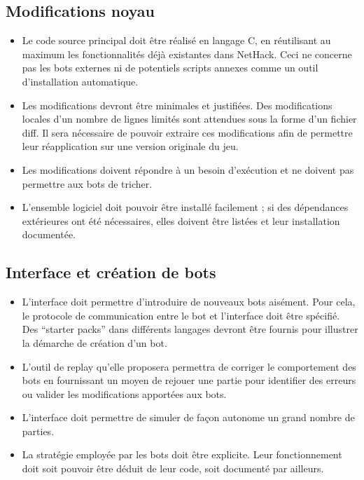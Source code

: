 \documentclass[12pt]{article}
\begin{document}
\subsection{Modifications noyau}

\begin{itemize}
	\item Le code source principal doit être réalisé en langage C, en réutilisant au maximum les fonctionnalités déjà existantes dans NetHack. Ceci ne concerne pas les bots externes ni de potentiels scripts annexes comme un outil d'installation automatique.
	\item Les modifications devront être minimales et justifiées. Des modifications locales d'un nombre de lignes limités sont attendues sous la forme d'un fichier diff. Il sera nécessaire de pouvoir extraire ces modifications afin de permettre leur réapplication sur une version originale du jeu.  
	\item Les modifications doivent répondre à un besoin d'exécution et ne doivent pas permettre aux bots de tricher.
	\item L'ensemble logiciel doit pouvoir être installé facilement ; si des dépendances extérieures ont été nécessaires, elles doivent être listées et leur installation documentée.
\end{itemize}

\subsection{Interface et création de bots}

\begin{itemize}
\item L'interface doit permettre d'introduire de nouveaux bots aisément. Pour cela, le protocole de communication entre le bot et l'interface doit être spécifié. Des ``starter packs'' dans différents langages devront être fournis pour illustrer la démarche de création d'un bot.
\item L'outil de replay qu'elle proposera permettra de corriger le comportement des bots en fournissant un moyen de rejouer une partie pour identifier des erreurs ou valider les modifications apportées aux bots.
\item L'interface doit permettre de simuler de façon autonome un grand nombre de parties.
\item La stratégie employée par les bots doit être explicite. Leur fonctionnement doit soit pouvoir être déduit de leur code, soit documenté par ailleurs.
\end{itemize}
\end{document}
